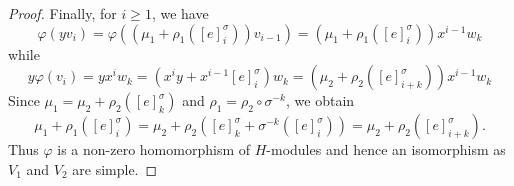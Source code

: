 \documentclass[10pt,a4paper]{amsart}
\newcommand{\wind}[2]{[#1]_{#2}^{\sigma}}
\begin{document}
\begin{proof}
Finally, for $i \geq 1$, we have
%
\[\varphi(y v_{i}) = \varphi((\mu_1 + \rho_1 (\wind{e}{i}))v_{i-1}) = (\mu_1 + \rho_1 (\wind{e}{i})) x^{i-1}w_{k}\]
%
while
%
\[y \varphi(v_{i}) = yx^i w_k = (x^iy + x^{i-1}\wind{e}{i})w_k = (\mu_2 + \rho_2 (\wind{e}{i+k})) x^{i-1} w_{k}\]
%
Since $\mu_1 = \mu_2 + \rho_2(\wind{e}{k})$ and $\rho_1=\rho_2\circ \sigma^{-k}$, we obtain
\[ \mu_1 + \rho_1 (\wind{e}{i}) = \mu_2 + \rho_2(\wind{e}{k} + \sigma^{-k} (\wind{e}{i})) = \mu_2 + \rho_2 (\wind{e}{i+k}).\]
Thus $\varphi$ is a non-zero homomorphism of $H$-modules and hence an isomorphism as $V_1$ and $V_2$ are simple.
\end{proof}
\end{document}
